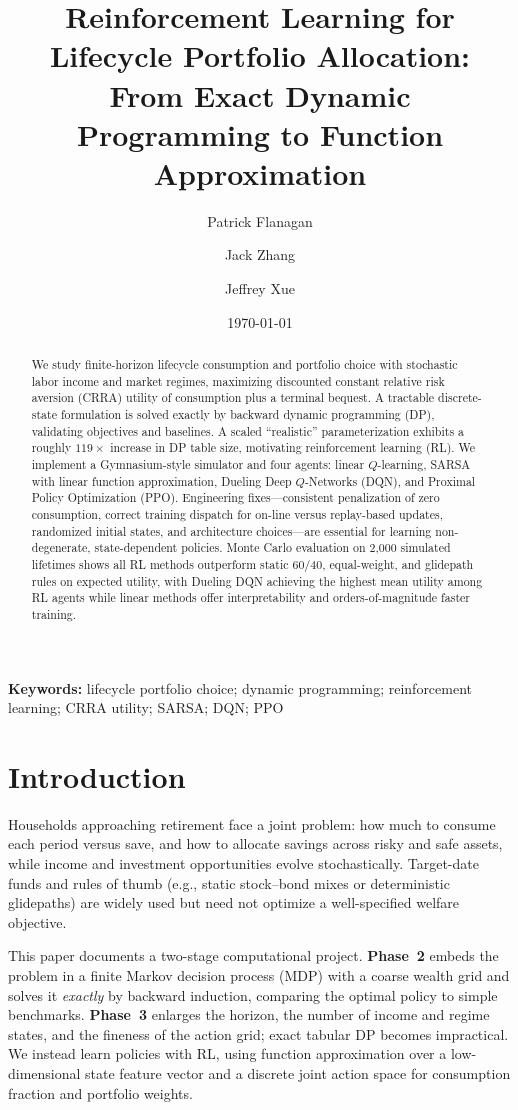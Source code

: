 \documentclass[11pt,a4paper]{article}
\title{Reinforcement Learning for Lifecycle Portfolio Allocation:\\
From Exact Dynamic Programming to Function Approximation}
\author[1]{Patrick Flanagan}
\author[1]{Jack Zhang}
\author[1]{Jeffrey Xue}
\affil[1]{Stanford University, CME 241 --- Reinforcement Learning for Stochastic Control in Finance (Winter 2026)}
\date{\today}
\begin{document}
\maketitle

\begin{abstract}
We study finite-horizon lifecycle consumption and portfolio choice with stochastic labor income and market regimes, maximizing discounted constant relative risk aversion (CRRA) utility of consumption plus a terminal bequest. A tractable discrete-state formulation is solved exactly by backward dynamic programming (DP), validating objectives and baselines. A scaled ``realistic'' parameterization exhibits a roughly $119\times$ increase in DP table size, motivating reinforcement learning (RL). We implement a Gymnasium-style simulator and four agents: linear $Q$-learning, SARSA with linear function approximation, Dueling Deep $Q$-Networks (DQN), and Proximal Policy Optimization (PPO). Engineering fixes---consistent penalization of zero consumption, correct training dispatch for on-line versus replay-based updates, randomized initial states, and architecture choices---are essential for learning non-degenerate, state-dependent policies. Monte Carlo evaluation on 2{,}000 simulated lifetimes shows all RL methods outperform static $60/40$, equal-weight, and glidepath rules on expected utility, with Dueling DQN achieving the highest mean utility among RL agents while linear methods offer interpretability and orders-of-magnitude faster training.
\end{abstract}

\noindent\textbf{Keywords:} lifecycle portfolio choice; dynamic programming; reinforcement learning; CRRA utility; SARSA; DQN; PPO

\section{Introduction}

Households approaching retirement face a joint problem: how much to consume each period versus save, and how to allocate savings across risky and safe assets, while income and investment opportunities evolve stochastically. Target-date funds and rules of thumb (e.g., static stock--bond mixes or deterministic glidepaths) are widely used but need not optimize a well-specified welfare objective.

This paper documents a two-stage computational project. \textbf{Phase~2} embeds the problem in a finite Markov decision process (MDP) with a coarse wealth grid and solves it \emph{exactly} by backward induction, comparing the optimal policy to simple benchmarks. \textbf{Phase~3} enlarges the horizon, the number of income and regime states, and the fineness of the action grid; exact tabular DP becomes impractical. We instead learn policies with RL, using function approximation over a low-dimensional state feature vector and a discrete joint action space for consumption fraction and portfolio weights.
\end{document}
